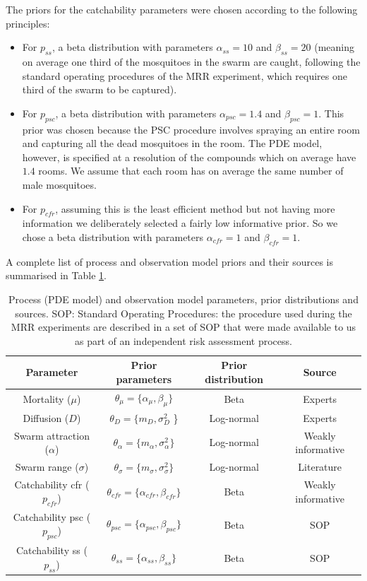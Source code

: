 \documentclass[]{bmcart}
\begin{document}
The priors for the catchability parameters were chosen according to the following principles:
\begin{itemize}
\item For $p_{ss}$, a beta distribution with parameters $\alpha_{ss} = 10$ and $\beta_{ss} = 20$ (meaning on average one third of the mosquitoes in the swarm are caught, following the standard operating procedures of the MRR experiment, which requires one third of the swarm to be captured).
\item For $p_{psc}$, a beta distribution with parameters $\alpha_{psc} = 1.4$ and $\beta_{psc} = 1$. This prior was chosen because the PSC procedure involves spraying an entire room and capturing all the dead mosquitoes in the room. The PDE model, however, is specified at a resolution of the compounds which on average have $1.4$ rooms. We assume that each room has on average the same number of male mosquitoes.
\item For $p_{cfr}$, assuming this is the least efficient method but not having more information we deliberately selected a fairly low informative prior. So we chose a beta distribution with parameters $\alpha_{cfr} = 1$ and $\beta_{cfr} = 1$.
\end{itemize} 
A complete list of process and observation model priors and their sources is summarised in Table \ref{tble:prior}.

\begin{table}[h]
\centering
\begingroup\small
\begin{tabular}{|c|ccc|}
\hline
Parameter & Prior parameters & Prior distribution & Source \\\hline
Mortality ($\mu$) & $ \theta_\mu = \{\alpha_{\mu}, \beta_{\mu}\}$ & Beta & Experts\\
Diffusion ($D$) & $\theta_D = \{ m_D, \sigma_D^2$ \} & Log-normal & Experts\\
Swarm attraction ($\alpha$) & $\theta_\alpha = \{ m_\alpha, \sigma_\alpha^2 \}$ & Log-normal &  Weakly informative \\ 
Swarm range ($\sigma$) &  $\theta_\sigma = \{m_\sigma, \sigma_\sigma^2 \}$ & Log-normal &  Literature\\ 
Catchability cfr ($p_{cfr}$) & $\theta_{cfr} =\{\alpha_{cfr}, \beta_{cfr}\}$ & Beta & Weakly informative \\ 
Catchability psc ($p_{psc}$) & $\theta_{psc} =\{\alpha_{psc}, \beta_{psc}\}$ & Beta & SOP \\ 
Catchability ss ($p_{ss}$) & $\theta_{ss} =\{\alpha_{ss}, \beta_{ss}\}$ & Beta & SOP \\
\hline
\end{tabular}
\endgroup
\caption{\label{tble:prior} Process (PDE model) and observation model parameters, prior distributions and sources. SOP: Standard Operating Procedures: the procedure used during the MRR experiments are described in a set of SOP that were made available to us as part of an independent risk assessment process.}
\end{table}
\end{document}
